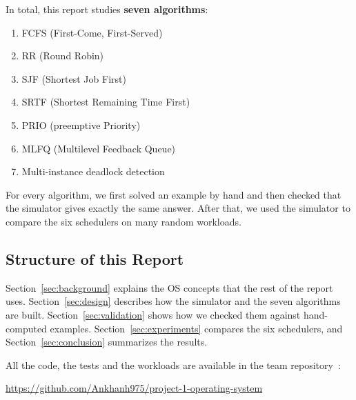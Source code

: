 In total, this report studies \textbf{seven algorithms}:
\begin{enumerate}
    \item FCFS (First-Come, First-Served)
    \item RR (Round Robin)
    \item SJF (Shortest Job First)
    \item SRTF (Shortest Remaining Time First)
    \item PRIO (preemptive Priority)
    \item MLFQ (Multilevel Feedback Queue)
    \item Multi-instance deadlock detection
\end{enumerate}
For every algorithm, we first solved an example by hand and then checked that the simulator gives exactly the same answer. After that, we used the simulator to compare the six schedulers on many random workloads.

\subsection{Structure of this Report}
Section~\ref{sec:background} explains the OS concepts that the rest of the report uses. Section~\ref{sec:design} describes how the simulator and the seven algorithms are built. Section~\ref{sec:validation} shows how we checked them against hand-computed examples. Section~\ref{sec:experiments} compares the six schedulers, and Section~\ref{sec:conclusion} summarizes the results.

All the code, the tests and the workloads are available in the team repository~\cite{repo}:
\begin{center}
    \url{https://github.com/Ankhanh975/project-1-operating-system}
\end{center}
